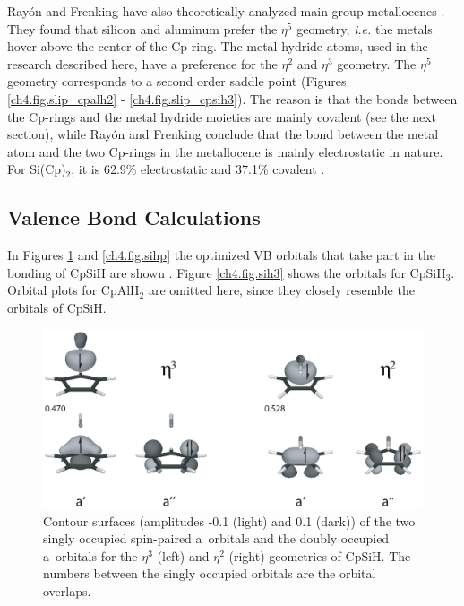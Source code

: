 Ray\'on and Frenking have also theoretically analyzed main group metallocenes \cite{rayon}. They found that silicon and aluminum prefer the $\eta^5$ geometry, \textit{i.e.} the metals hover above the center of the Cp-ring. The metal hydride atoms, used in the research described here, have a preference for the $\eta^2$ and $\eta^3$ geometry. The $\eta^5$ geometry corresponds to a second order saddle point (Figures \ref{ch4.fig.slip_cpalh2} - \ref{ch4.fig.slip_cpsih3}). The reason is that the bonds between the Cp-rings and the metal hydride moieties are mainly covalent (see the next section), while Ray\'on and Frenking conclude that the bond between the metal atom and the two Cp-rings in the metallocene is mainly electrostatic in nature. For Si(Cp)$_2$, it is 62.9\% electrostatic and 37.1\% covalent \cite{rayon}.

\subsection{Valence Bond Calculations}

In Figures \ref{ch4.fig.sihs} and \ref{ch4.fig.sihp} the optimized VB orbitals that take part in the bonding of CpSiH are shown \cite{molden}. Figure \ref{ch4.fig.sih3} shows the orbitals for CpSiH$_3$. Orbital plots for CpAlH$_2$ are omitted here, since they closely resemble the orbitals of CpSiH. 

\begin{figure} [htbp]
\begin{center}
\includegraphics[scale=0.67]{cyclopentadienyl/figures/sih_sigma.eps}
\end{center}
\caption{Contour surfaces (amplitudes -0.1 (light) and 0.1 (dark)) of the two singly occupied spin-paired a\textquotesingle\ orbitals and the doubly occupied a\textquotesingle\textquotesingle\ orbitals for the $\eta^{3}$ (left) and $\eta^{2}$ (right) geometries of CpSiH. The numbers between the singly occupied orbitals are the orbital overlaps.}
\label{ch4.fig.sihs}
\end{figure}

